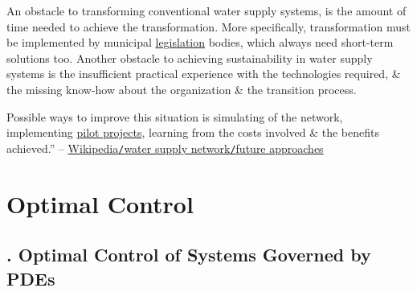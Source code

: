 \documentclass[oneside]{book}
\numberwithin{equation}{section}
\begin{document}
An obstacle to transforming conventional water supply systems, is the amount of time needed to achieve the transformation. More specifically, transformation must be implemented by municipal \href{https://en.wikipedia.org/wiki/Legislation}{legislation} bodies, which always need short-term solutions too. Another obstacle to achieving sustainability in water supply systems is the insufficient practical experience with the technologies required, \& the missing know-how about the organization \& the transition process.

Possible ways to improve this situation is simulating of the network, implementing \href{https://en.wikipedia.org/wiki/Pilot_project}{pilot projects}, learning from the costs involved \& the benefits achieved.'' -- \href{https://en.wikipedia.org/wiki/Water_supply_network#Future_approaches}{Wikipedia\texttt{/}water supply network\texttt{/}future approaches}


\part{Optimal Control}

\chapter{\cite{Lions1971}. Optimal Control of Systems Governed by PDEs}
\end{document}
